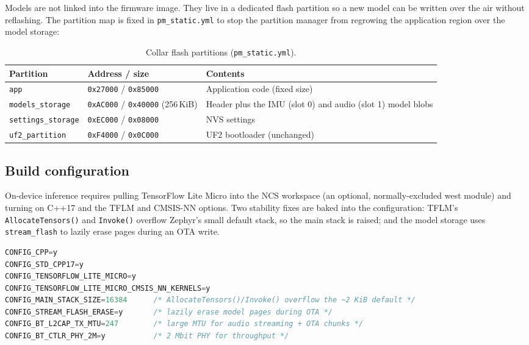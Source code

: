 Models are not linked into the firmware image. They live in a dedicated flash partition so a new model
can be written over the air without reflashing. The partition map is fixed in \texttt{pm\_static.yml}
to stop the partition manager from regrowing the application region over the model storage:

\begin{table}[ht]
  \centering
  \caption{Collar flash partitions (\texttt{pm\_static.yml}).}
  \label{tab:flash}
  \begin{tabularx}{\textwidth}{@{}llX@{}}
    \toprule
    \textbf{Partition} & \textbf{Address / size} & \textbf{Contents} \\
    \midrule
    \texttt{app}              & \texttt{0x27000} / \texttt{0x85000} & Application code (fixed size) \\
    \texttt{models\_storage}  & \texttt{0xAC000} / \texttt{0x40000} (256\,KiB) &
      Header plus the IMU (slot 0) and audio (slot 1) model blobs \\
    \texttt{settings\_storage} & \texttt{0xEC000} / \texttt{0x08000} & NVS settings \\
    \texttt{uf2\_partition}   & \texttt{0xF4000} / \texttt{0x0C000} & UF2 bootloader (unchanged) \\
    \bottomrule
  \end{tabularx}
\end{table}

\subsection{Build configuration}

On-device inference requires pulling TensorFlow Lite Micro into the NCS workspace (an optional,
normally-excluded west module) and turning on C++17 and the TFLM and CMSIS-NN options. Two stability
fixes are baked into the configuration: TFLM's \texttt{AllocateTensors()} and \texttt{Invoke()}
overflow Zephyr's small default stack, so the main stack is raised; and the model storage uses
\texttt{stream\_flash} to lazily erase pages during an OTA write.

\begin{lstlisting}[language=C,caption={Inference-related \texttt{prj.conf} settings (collar).},label={lst:prjconf}]
CONFIG_CPP=y
CONFIG_STD_CPP17=y
CONFIG_TENSORFLOW_LITE_MICRO=y
CONFIG_TENSORFLOW_LITE_MICRO_CMSIS_NN_KERNELS=y
CONFIG_MAIN_STACK_SIZE=16384      /* AllocateTensors()/Invoke() overflow the ~2 KiB default */
CONFIG_STREAM_FLASH_ERASE=y       /* lazily erase model pages during OTA */
CONFIG_BT_L2CAP_TX_MTU=247        /* large MTU for audio streaming + OTA chunks */
CONFIG_BT_CTLR_PHY_2M=y           /* 2 Mbit PHY for throughput */
\end{lstlisting}

